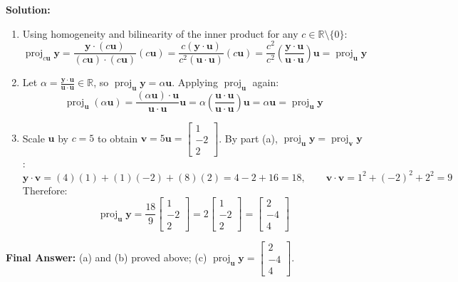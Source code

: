 \documentclass[11pt, letterpaper]{article}
\theoremstyle{definition}
\theoremstyle{remark}
\begin{document}
\textbf{Solution:}
\begin{enumerate}[label=(\alph*)]
    \item Using homogeneity and bilinearity of the inner product for any $c \in \mathbb{R} \setminus \{0\}$:
    \[
    \operatorname{proj}_{c\mathbf{u}}\mathbf{y} = \frac{\mathbf{y} \cdot (c\mathbf{u})}{(c\mathbf{u}) \cdot (c\mathbf{u})}(c\mathbf{u}) = \frac{c(\mathbf{y} \cdot \mathbf{u})}{c^2(\mathbf{u} \cdot \mathbf{u})}(c\mathbf{u}) = \frac{c^2}{c^2}\left(\frac{\mathbf{y} \cdot \mathbf{u}}{\mathbf{u} \cdot \mathbf{u}}\right)\mathbf{u} = \operatorname{proj}_{\mathbf{u}}\mathbf{y}
    \]
    \item Let $\alpha = \frac{\mathbf{y} \cdot \mathbf{u}}{\mathbf{u} \cdot \mathbf{u}} \in \mathbb{R}$, so $\operatorname{proj}_{\mathbf{u}}\mathbf{y} = \alpha\mathbf{u}$. Applying $\operatorname{proj}_{\mathbf{u}}$ again:
    \[
    \operatorname{proj}_{\mathbf{u}}(\alpha\mathbf{u}) = \frac{(\alpha\mathbf{u}) \cdot \mathbf{u}}{\mathbf{u} \cdot \mathbf{u}}\mathbf{u} = \alpha\left(\frac{\mathbf{u} \cdot \mathbf{u}}{\mathbf{u} \cdot \mathbf{u}}\right)\mathbf{u} = \alpha\mathbf{u} = \operatorname{proj}_{\mathbf{u}}\mathbf{y}
    \]
    \item Scale $\mathbf{u}$ by $c = 5$ to obtain $\mathbf{v} = 5\mathbf{u} = \begin{bmatrix} 1 \\ -2 \\ 2 \end{bmatrix}$. By part (a), $\operatorname{proj}_{\mathbf{u}}\mathbf{y} = \operatorname{proj}_{\mathbf{v}}\mathbf{y}$:
    \[
    \mathbf{y} \cdot \mathbf{v} = (4)(1) + (1)(-2) + (8)(2) = 4 - 2 + 16 = 18, \qquad \mathbf{v} \cdot \mathbf{v} = 1^2 + (-2)^2 + 2^2 = 9
    \]
    Therefore:
    \[
    \operatorname{proj}_{\mathbf{u}}\mathbf{y} = \frac{18}{9}\begin{bmatrix} 1 \\ -2 \\ 2 \end{bmatrix} = 2\begin{bmatrix} 1 \\ -2 \\ 2 \end{bmatrix} = \begin{bmatrix} 2 \\ -4 \\ 4 \end{bmatrix}
    \]
\end{enumerate}
\textbf{Final Answer:} (a) and (b) proved above; (c) $\operatorname{proj}_{\mathbf{u}}\mathbf{y} = \begin{bmatrix} 2 \\ -4 \\ 4 \end{bmatrix}$.
\end{document}
